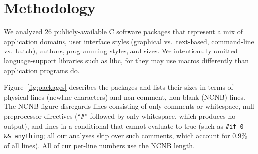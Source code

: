 \documentclass[10pt]{article}
\def\numpackages{26}
\newcommand{\pkg}[1]{\textsf{#1}}
\begin{document}
%

%






\section{Methodology}
\label{sec:methodology}


We analyzed {\numpackages} publicly-available C software packages that
represent a mix of application domains, user interface styles (graphical vs.\ 
text-based, command-line vs.\ batch), authors, programming styles, and
sizes.  We intentionally omitted language-support libraries such as \pkg{libc}, for they
may use macros differently than application programs do.

Figure~\ref{fig:packages} describes the packages and lists their sizes in
terms of physical lines (newline characters) and non-comment, non-blank
(NCNB) lines.  The NCNB figure disregards lines consisting of only comments
or whitespace, null preprocessor directives (``{\tt \#}'' followed by only
whitespace, which produces no output), and lines in a conditional that
cannot evaluate to true (such as {\tt \#if 0 \&\& anything}; all our
analyses skip over such comments, which account for 0.9\% of all lines).
All of our per-line numbers use the NCNB length.
\end{document}
